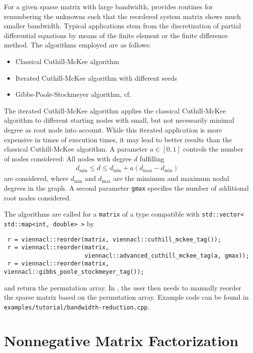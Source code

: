 For a given sparse matrix with large bandwidth, {\ViennaCL} provides routines for renumbering the unknowns such that the reordered system matrix shows much
smaller bandwidth. Typical applications stem from the discretization of partial differential equations by means of the finite element or the finite difference
method. The algorithms employed are as follows:
\begin{itemize}
 \item Classical Cuthill-McKee algorithm \cite{cuthill:reducing-bandwidth}
 \item Iterated Cuthill-McKee algorithm with different seeds \cite{cuthill:reducing-bandwidth}
 \item Gibbs-Poole-Stockmeyer algorithm, cf.~\cite{lewis:gps-algorithm}
\end{itemize}
The iterated Cuthill-McKee algorithm applies the classical Cuthill-McKee algorithm to different starting nodes with small, but not necessarily minimal degree as root node into account.
While this iterated application is more expensive in times of execution times, it may lead to better results than the classical Cuthill-McKee algorithm.
A parameter $a \in [0,1]$ controls the number of nodes considered: All nodes with degree $d$ fulfilling
\begin{align*}
 d_{\min} \leq d \leq d_{\min} + a(d_{\max} - d_{\min})
\end{align*}
are considered, where $d_{\min}$ and $d_{\max}$ are the miminum and maximum nodal degrees in the graph.
A second parameter \lstinline|gmax| specifies the number of additional root nodes considered.

The algorithms are called for a \lstinline|matrix| of a type compatible with \lstinline|std::vector< std::map<int, double> >| by
\begin{lstlisting}
 r = viennacl::reorder(matrix, viennacl::cuthill_mckee_tag());
 r = viennacl::reorder(matrix,
                       viennacl::advanced_cuthill_mckee_tag(a, gmax));
 r = viennacl::reorder(matrix, viennacl::gibbs_poole_stockmeyer_tag());
\end{lstlisting}
and return the permutation array. In {\ViennaCLversion}, the user then needs to manually reorder the sparse matrix based on the permutation array. Example code
can be found in \lstinline|examples/tutorial/bandwidth-reduction.cpp|.


\section{Nonnegative Matrix Factorization}

